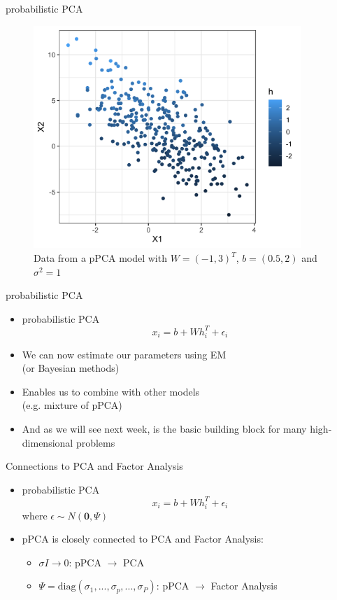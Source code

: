 \documentclass[10pt]{beamer}
\begin{document}
\begin{frame}{probabilistic PCA}

\begin{figure}[h]
\centering
\includegraphics[width=0.9\textwidth]{fig/pPCA_h.png}
\caption{Data from a pPCA model with $W = (-1, 3)^T$, $b = (0.5, 2)$ and $\sigma^2 = 1$}
\end{figure}

\end{frame}


\begin{frame}{probabilistic PCA}

\begin{itemize}
\item probabilistic PCA
\[
x_i = b +  W h_i^T + \epsilon_i
\]
\pause
\item We can now {\color{uured} estimate our parameters} using EM \\ (or Bayesian methods)
\item Enables us to {\color{uured} combine with other models} \\ (e.g. mixture of pPCA)
\pause
\item And as we will see next week, is the {\color{uured} basic building block} for many high-dimensional problems
\end{itemize}

\end{frame}


\begin{frame}{Connections to PCA and Factor Analysis}

\begin{itemize}
\item probabilistic PCA
\[
x_i = b +  W h_i^T + \epsilon_i
\]
where $\epsilon \sim N(\mathbf{0}, \Psi)$
\item pPCA is closely connected to PCA and Factor Analysis:
\begin{itemize}
\item $\sigma I \rightarrow 0$: pPCA $\rightarrow$ {\color{uured} PCA}
\item $\Psi = \text{diag}(\sigma_1, ..., \sigma_p, ..., \sigma_P)$: pPCA $\rightarrow$ {\color{uured} Factor Analysis}
\end{itemize}
\end{itemize}

\end{frame}
\end{document}
